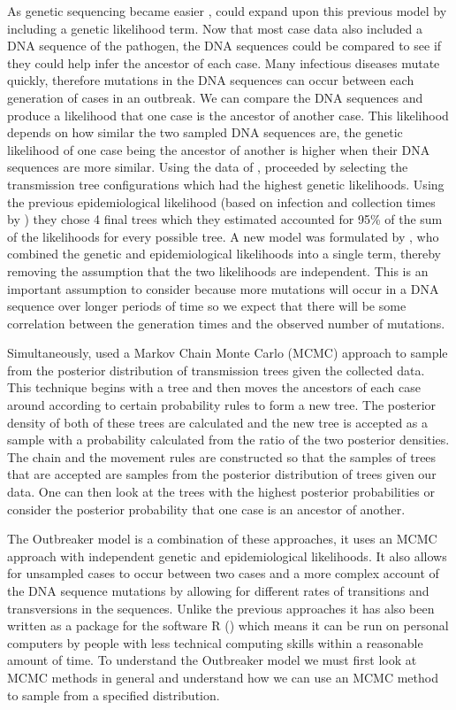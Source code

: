 \documentclass[11pt,a4paper]{report}
\begin{document}
As genetic sequencing became easier \citep{Koser12}, \citet{Cottam08} could expand upon this previous model by including a genetic likelihood term. Now that most case data also included a DNA sequence of the pathogen, the DNA sequences could be compared to see if they could help infer the  ancestor of each case. Many infectious diseases mutate quickly, therefore mutations in the DNA sequences can occur between each generation of cases in an outbreak. We can compare the DNA sequences and produce a likelihood that one case is the ancestor of another case. This likelihood depends on how similar the two sampled DNA sequences are, the genetic likelihood of one case being the ancestor of another is higher when their DNA sequences are more similar. Using the data of \citet{Haydon03}, \citet{Cottam08} proceeded by selecting the transmission tree configurations which had the highest genetic likelihoods. Using the previous epidemiological likelihood (based on infection and collection times by \citet{Haydon03}) they chose 4 final trees which they estimated accounted for 95\% of the sum of the likelihoods for every possible tree. A new model was formulated by \citet{Ypma13}, who combined the genetic and epidemiological likelihoods into a single term, thereby removing the assumption that the two likelihoods are independent. This is an important assumption to consider because more mutations will occur in a DNA sequence over longer periods of time so we expect that there will be some correlation between the generation times and the observed number of mutations.

Simultaneously, \citet{Morelli12} used a Markov Chain Monte Carlo (MCMC) approach to sample from the posterior distribution of transmission trees given the collected data. This technique begins with a tree and then moves the ancestors of each case around according to certain probability rules to form a new tree. The posterior density of both of these trees are calculated and the new tree is accepted as a sample with a probability calculated from the ratio of the two posterior densities. The chain and the movement rules are constructed so that the samples of trees that are accepted are samples from the posterior distribution of trees given our data. One can then look at the trees with the highest posterior probabilities or consider the posterior probability that one case is an ancestor of another.

The Outbreaker model is a combination of these approaches, it uses an MCMC approach with independent genetic and epidemiological likelihoods. It also allows for unsampled cases to occur between two cases and a more complex account of the DNA sequence mutations by allowing for different rates of transitions and transversions in the sequences. Unlike the previous approaches it has also been written as a package for the software R (\citet{R14}) which means it can be run on personal computers by people with less technical computing skills within a reasonable amount of time. To understand the Outbreaker model we must first look at MCMC methods in general and understand how we can use an MCMC method to sample from a specified distribution.
\end{document}
